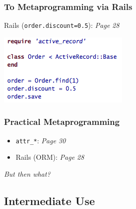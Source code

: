 \documentclass[slidestop,compress,mathserif]{beamer}
\begin{document}
\begin{frame} \frametitle{To Metaprogramming via Rails}
	Rails (\texttt{order.discount=0.5}):  \emph{Page 28}
	\begin{center}
		\includegraphics[scale=0.55]{img/awdwr_mp.png}
	\end{center}
\end{frame}

\begin{frame}
	\frametitle{Practical Metaprogramming}
	\begin{itemize}
		\item \texttt{attr\_*}:  \emph{Page 30}
		\item Rails (ORM):  \emph{Page 28}
	\end{itemize}
	\pause
	\vskip 0.5cm
	\emph{But then what?}
\end{frame}

\subsection{Intermediate Use} %
\label{sub:intermediate_use}
\end{document}
